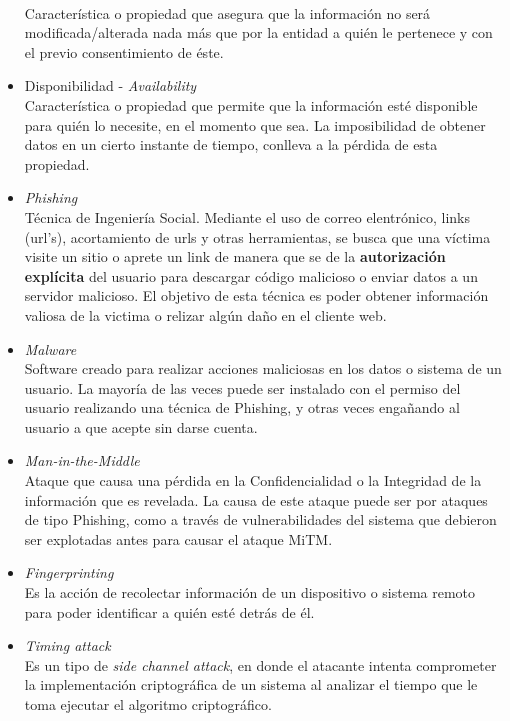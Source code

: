 \begin{itemize}
        \\Característica o propiedad que asegura que la información no será modificada/alterada nada más que por la entidad a quién le pertenece y con el previo consentimiento de éste.
    \item Disponibilidad - \textit{Availability}
        \\Característica o propiedad que permite que la información esté disponible para quién lo necesite, en el momento que sea. La imposibilidad de obtener datos en un cierto instante de tiempo, conlleva a la pérdida de esta propiedad.
    \item \textit{Phishing}
        \\Técnica de Ingeniería Social. Mediante el uso de correo elentrónico, links (url's), acortamiento de urls y otras herramientas, se busca que una víctima visite un sitio o aprete un link de manera que se de la \textbf{autorización explícita} del usuario para descargar código malicioso o enviar datos a un servidor malicioso. El objetivo de esta técnica es poder obtener información valiosa de la victima o relizar algún daño en el cliente web.
    \item \textit{Malware}
        \\Software creado para realizar acciones maliciosas en los datos o sistema de un usuario. La mayoría de las veces puede ser instalado con el permiso del usuario realizando una técnica de Phishing, y otras veces engañando al usuario a que acepte sin darse cuenta.
    \item \textit{Man-in-the-Middle}
        \\Ataque que causa una pérdida en la Confidencialidad o la Integridad de la información que es revelada. La causa de este ataque puede ser por ataques de tipo Phishing, como a través de vulnerabilidades del sistema que debieron ser explotadas antes para causar el ataque MiTM.
    \item \textit{Fingerprinting}
        \\Es la acción de recolectar información de un dispositivo o sistema remoto para poder identificar a quién esté detrás de él.
    \item \textit{Timing attack}
        \\Es un tipo de \textit{side channel attack}, en donde el atacante intenta comprometer la implementación criptográfica de un sistema al analizar el tiempo que le toma ejecutar el algoritmo criptográfico.
\end{itemize}
